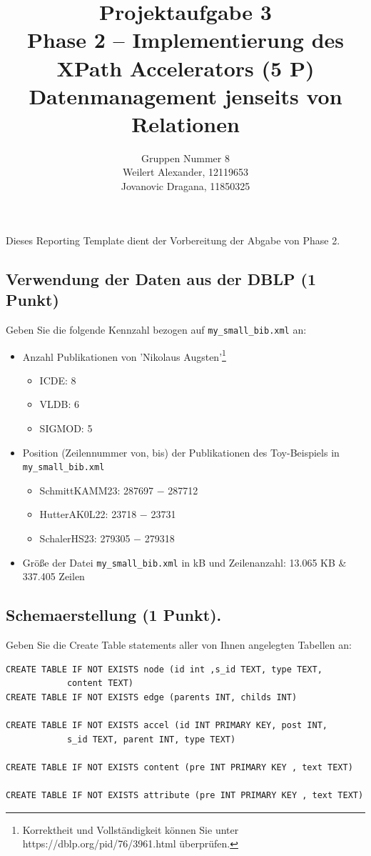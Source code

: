 \documentclass[11pt]{scrartcl}
\title{
  \textbf{\large Projektaufgabe 3 } \\
  Phase 2 – Implementierung des XPath Accelerators (5 P) \\
  {\large Datenmanagement jenseits von Relationen}
}
\author{
	Gruppen Nummer 8 \\
	\large Weilert Alexander, 12119653 \\
	\large Jovanovic Dragana, 11850325
}
\begin{document}
\maketitle\thispagestyle{empty}

Dieses Reporting Template dient der Vorbereitung der Abgabe von Phase 2.

\subsection*{Verwendung der Daten aus der DBLP (1 Punkt)}

Geben Sie die folgende Kennzahl bezogen auf \texttt{my\_small\_bib.xml} an:

\begin{itemize}
	\item Anzahl Publikationen von 'Nikolaus Augsten'\footnote{Korrektheit und Vollständigkeit können Sie unter https://dblp.org/pid/76/3961.html überprüfen.}
		\begin{itemize}
		\item ICDE: 8
		\item VLDB: 6
		\item SIGMOD: 5
	\end{itemize}
	\item Position (Zeilennummer von, bis) der Publikationen des Toy-Beispiels in \texttt{my\_small\_bib.xml}
	
	\begin{itemize}
		\item SchmittKAMM23: 287697 $-$ 287712
		\item HutterAK0L22: 23718 $-$ 23731
		\item SchalerHS23: 279305 $-$ 279318
	\end{itemize}
	\item Größe der Datei \texttt{my\_small\_bib.xml} in kB und Zeilenanzahl: 13.065 KB \& 337.405 Zeilen
\end{itemize}



\subsection*{Schemaerstellung (1 Punkt).}
Geben Sie die Create Table statements aller von Ihnen angelegten Tabellen an:
\begin{lstlisting}[style=dmrsql]
CREATE TABLE IF NOT EXISTS node (id int ,s_id TEXT, type TEXT,
			content TEXT)
CREATE TABLE IF NOT EXISTS edge (parents INT, childs INT)

CREATE TABLE IF NOT EXISTS accel (id INT PRIMARY KEY, post INT,
			s_id TEXT, parent INT, type TEXT)

CREATE TABLE IF NOT EXISTS content (pre INT PRIMARY KEY , text TEXT)

CREATE TABLE IF NOT EXISTS attribute (pre INT PRIMARY KEY , text TEXT)
\end{lstlisting}
\end{document}
